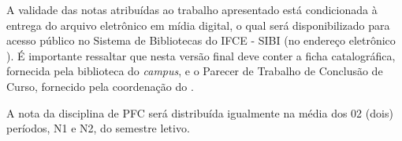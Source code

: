 A validade das notas atribuídas ao trabalho apresentado está condicionada à entrega %
do arquivo eletrônico em mídia digital, o qual será disponibilizado para acesso público no Sistema de Bibliotecas do IFCE - SIBI (no endereço eletrônico ). É importante ressaltar que nesta versão final deve conter a ficha catalográfica, fornecida pela biblioteca do \textit{campus}, e o Parecer de Trabalho de Conclusão de Curso, fornecido pela coordenação do \NOMECURSO.

A nota da disciplina de PFC será distribuída igualmente na média dos 02 (dois) períodos, N1 e N2, do semestre letivo.




